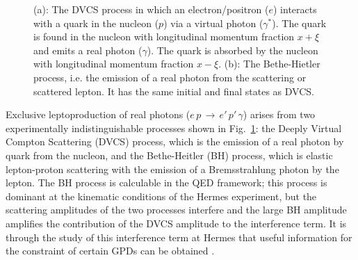 \begin{figure}
\begin{center}
\hspace{3cm}
\caption[DVCS and Bethe Heitler hand bag diagram.]{(a): The DVCS process in
which an electron/positron ($e$) interacts with a quark in the nucleon
($p$) via a virtual photon ($\gamma^\ast$). The quark is found in the
nucleon with longitudinal momentum fraction $x+\xi$ and emits a real
photon ($\gamma$). The quark is absorbed by the nucleon with
longitudinal momentum fraction
$x-\xi$. (b): The Bethe-Hietler process, i.e. the emission of a real photon from the scattering or
scattered lepton. It has the same initial and final states as DVCS.}
\label{spin}
\end{center}
\end{figure}

Exclusive leptoproduction of real photons
($e\,p\,\rightarrow\,e'\,p'\,\gamma$) arises from
two experimentally indistinguishable processes shown in
Fig.~\ref{spin}: the Deeply Virtual Compton Scattering (DVCS) process,
which is the emission of a real photon by  quark from the nucleon, and the Bethe-Heitler (BH) process, which is elastic lepton-proton scattering with the
emission of a Bremsstrahlung photon by the lepton. 
The BH process is calculable in the QED framework; this process is
dominant at the kinematic conditions of the H{\sc ermes} experiment, but the
scattering amplitudes of the two processes interfere and the large BH amplitude
amplifies the contribution of the DVCS amplitude to the interference term. 
It is through the study of this interference term at H{\sc ermes} that
useful information for the constraint of certain GPDs can be obtained \cite{Bel02b}.

